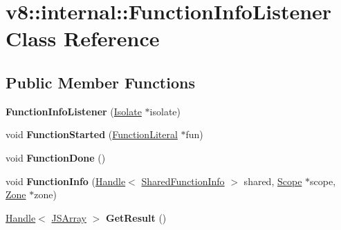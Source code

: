 \hypertarget{classv8_1_1internal_1_1_function_info_listener}{}\section{v8\+:\+:internal\+:\+:Function\+Info\+Listener Class Reference}
\label{classv8_1_1internal_1_1_function_info_listener}
\subsection*{Public Member Functions}
\begin{DoxyCompactItemize}
\item 
{\bfseries Function\+Info\+Listener} (\hyperlink{classv8_1_1internal_1_1_isolate}{Isolate} $\ast$isolate)\hypertarget{classv8_1_1internal_1_1_function_info_listener_a49e145893a837c2421a322ca4b24fad4}{}\label{classv8_1_1internal_1_1_function_info_listener_a49e145893a837c2421a322ca4b24fad4}

\item 
void {\bfseries Function\+Started} (\hyperlink{classv8_1_1internal_1_1_function_literal}{Function\+Literal} $\ast$fun)\hypertarget{classv8_1_1internal_1_1_function_info_listener_ad162ca599f015e500f6e84abc62709ef}{}\label{classv8_1_1internal_1_1_function_info_listener_ad162ca599f015e500f6e84abc62709ef}

\item 
void {\bfseries Function\+Done} ()\hypertarget{classv8_1_1internal_1_1_function_info_listener_ae1d65a484f3133c2c12ff9b789451245}{}\label{classv8_1_1internal_1_1_function_info_listener_ae1d65a484f3133c2c12ff9b789451245}

\item 
void {\bfseries Function\+Info} (\hyperlink{classv8_1_1internal_1_1_handle}{Handle}$<$ \hyperlink{classv8_1_1internal_1_1_shared_function_info}{Shared\+Function\+Info} $>$ shared, \hyperlink{classv8_1_1internal_1_1_scope}{Scope} $\ast$scope, \hyperlink{classv8_1_1internal_1_1_zone}{Zone} $\ast$zone)\hypertarget{classv8_1_1internal_1_1_function_info_listener_a3eb9b56c0e96d996e68426593cae1e7a}{}\label{classv8_1_1internal_1_1_function_info_listener_a3eb9b56c0e96d996e68426593cae1e7a}

\item 
\hyperlink{classv8_1_1internal_1_1_handle}{Handle}$<$ \hyperlink{classv8_1_1internal_1_1_j_s_array}{J\+S\+Array} $>$ {\bfseries Get\+Result} ()\hypertarget{classv8_1_1internal_1_1_function_info_listener_afd115427969fa4f177873046b0d8708f}{}\label{classv8_1_1internal_1_1_function_info_listener_afd115427969fa4f177873046b0d8708f}

\end{DoxyCompactItemize}
